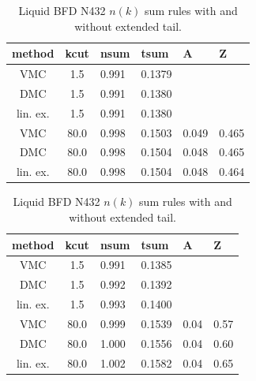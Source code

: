 \documentclass[aps,prl,superscriptaddress]{revtex4-1}
\newcommand{\midrule}{\hline}
\newcommand{\bottomrule}{\hline\hline}
\begin{document}
\begin{table}[h]
\caption{Disordered configurations spherically-averaged momentum distribution sum rules and tail. \label{tab:conf-ntsum}}
\begin{subtable}{0.49\textwidth}
\caption{Solid configuration BFD N432 $n(k)$ sum rules with and without extended tail.\label{tab:solid-conf31-bfd-n432-sum02}}
\begin{tabular}{ccllll}
\toprule
method & kcut & nsum & tsum & A & Z \\
\midrule
VMC & 1.5 & 0.991 & 0.1379 & \\
DMC & 1.5 & 0.991 & 0.1380 & \\
lin. ex. & 1.5 & 0.991 & 0.1380 & \\
VMC & 80.0 & 0.998 & 0.1503 & 0.049 & 0.465 \\
DMC & 80.0 & 0.998 & 0.1504 & 0.048 & 0.465 \\
lin. ex. & 80.0 & 0.998 & 0.1504 & 0.048 & 0.464\\
\bottomrule
\end{tabular}
\end{subtable}
\begin{subtable}{0.49\textwidth}
\caption{Liquid BFD N432 $n(k)$ sum rules with and without extended tail.\label{tab:liquid-bfd-n432-sum02}}
\begin{tabular}{ccllll}
\toprule
method & kcut & nsum & tsum & A & Z \\
\midrule
VMC & 1.5 & 0.991 & 0.1385 & \\
DMC & 1.5 & 0.992 & 0.1392 & \\
lin. ex. & 1.5 & 0.993 & 0.1400 & \\
VMC & 80.0 & 0.999 & 0.1539 & 0.04 & 0.57 \\
DMC & 80.0 & 1.000 & 0.1556 & 0.04 & 0.60 \\
lin. ex. & 80.0 & 1.002 & 0.1582 & 0.04 & 0.65\\
\bottomrule
\end{tabular}
\end{subtable}
\end{table}
\end{document}
